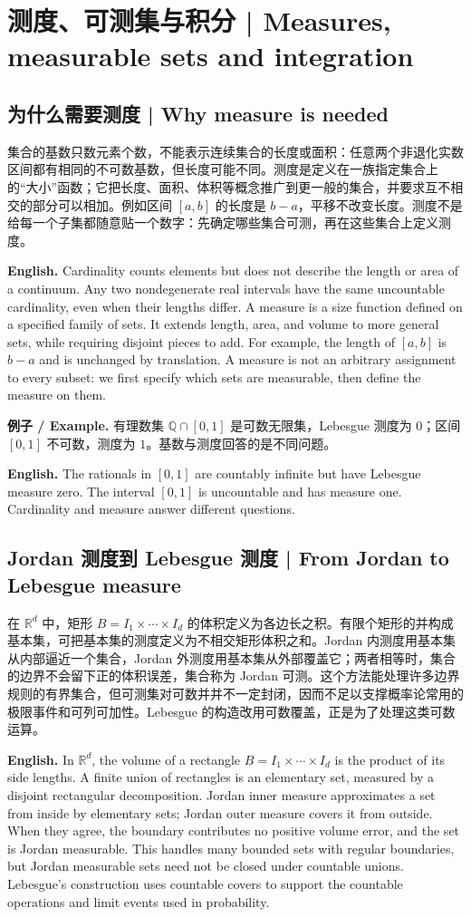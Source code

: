 \documentclass[UTF8,11pt,a4paper]{ctexart}
\newcommand{\EN}[1]{\par\noindent\textbf{English.} #1\par}
\newcommand{\EX}[2]{\par\noindent\textbf{例子 / Example.} #1\par\EN{#2}}
\begin{document}
\section{测度、可测集与积分 | Measures, measurable sets and integration}
\subsection{为什么需要测度 | Why measure is needed}
\noindent 集合的基数只数元素个数，不能表示连续集合的长度或面积：任意两个非退化实数区间都有相同的不可数基数，但长度可能不同。测度是定义在一族指定集合上的“大小”函数；它把长度、面积、体积等概念推广到更一般的集合，并要求互不相交的部分可以相加。例如区间 $[a,b]$ 的长度是 $b-a$，平移不改变长度。测度不是给每一个子集都随意贴一个数字：先确定哪些集合可测，再在这些集合上定义测度。
\EN{Cardinality counts elements but does not describe the length or area of a continuum. Any two nondegenerate real intervals have the same uncountable cardinality, even when their lengths differ. A measure is a size function defined on a specified family of sets. It extends length, area, and volume to more general sets, while requiring disjoint pieces to add. For example, the length of $[a,b]$ is $b-a$ and is unchanged by translation. A measure is not an arbitrary assignment to every subset: we first specify which sets are measurable, then define the measure on them.}

\EX{有理数集 $\mathbb Q\cap[0,1]$ 是可数无限集，Lebesgue 测度为 $0$；区间 $[0,1]$ 不可数，测度为 $1$。基数与测度回答的是不同问题。}{The rationals in $[0,1]$ are countably infinite but have Lebesgue measure zero. The interval $[0,1]$ is uncountable and has measure one. Cardinality and measure answer different questions.}

\subsection{Jordan 测度到 Lebesgue 测度 | From Jordan to Lebesgue measure}
\noindent 在 $\mathbb R^d$ 中，矩形 $B=I_1\times\cdots\times I_d$ 的体积定义为各边长之积。有限个矩形的并构成基本集，可把基本集的测度定义为不相交矩形体积之和。Jordan 内测度用基本集从内部逼近一个集合，Jordan 外测度用基本集从外部覆盖它；两者相等时，集合的边界不会留下正的体积误差，集合称为 Jordan 可测。这个方法能处理许多边界规则的有界集合，但可测集对可数并并不一定封闭，因而不足以支撑概率论常用的极限事件和可列可加性。Lebesgue 的构造改用可数覆盖，正是为了处理这类可数运算。
\EN{In $\mathbb R^d$, the volume of a rectangle $B=I_1\times\cdots\times I_d$ is the product of its side lengths. A finite union of rectangles is an elementary set, measured by a disjoint rectangular decomposition. Jordan inner measure approximates a set from inside by elementary sets; Jordan outer measure covers it from outside. When they agree, the boundary contributes no positive volume error, and the set is Jordan measurable. This handles many bounded sets with regular boundaries, but Jordan measurable sets need not be closed under countable unions. Lebesgue's construction uses countable covers to support the countable operations and limit events used in probability.}
\end{document}
